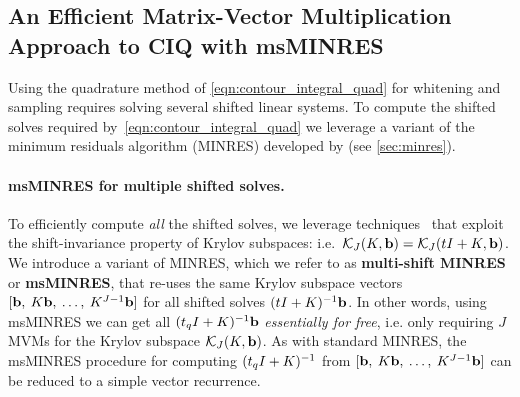 \subsection{An Efficient Matrix-Vector Multiplication Approach to CIQ with msMINRES}
%
Using the quadrature method of \cref{eqn:contour_integral_quad} for whitening and sampling requires solving several shifted linear systems.
To compute the shifted solves required by~\cref{eqn:contour_integral_quad} we leverage a variant of the
minimum residuals algorithm (MINRES) developed by \citet{paige1975solution} (see \cref{sec:minres}).

\paragraph{msMINRES for multiple shifted solves.}
To efficiently compute \emph{all} the shifted solves, we leverage techniques~\citep[e.g.][]{datta1991arnoldi,freund1990conjugate,meerbergen2003solution} that exploit the shift-invariance property of Krylov subspaces: i.e.~$\mathcal{K}_J(K, \mathbf{b}) = \mathcal{K}_J(t I +  K, \mathbf{b})$.
We introduce a variant of MINRES, which we refer to as {\bf multi-shift MINRES} or {\bf msMINRES}, that re-uses the same Krylov subspace vectors $[\mathbf{b}, \: K \mathbf{b}, \: \ldots, \: K^{J-1} \mathbf{b}]$ for all shifted solves $(t I + K)^{-1} \mathbf{b}$.
In other words, using msMINRES we can get all $(t_q I + K)^{-1} \mathbf{b}$ \emph{essentially for free}, i.e. only requiring $J$ MVMs for the Krylov subspace $\mathcal{K}_J(K, \mathbf{b})$.
As with standard MINRES, the msMINRES procedure for computing $(t_q I + K)^{-1}$ from $[\mathbf{b}, \: K \mathbf{b}, \: \ldots, \: K^{J-1} \mathbf{b}]$ can be reduced to a simple vector recurrence.

